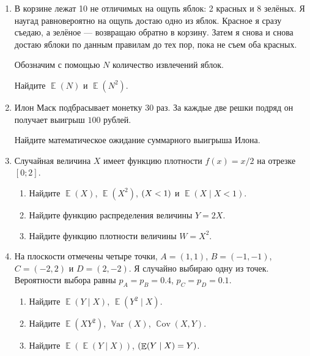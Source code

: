 \documentclass[12pt]{article}
\DeclareMathOperator{\Cov}{\mathbb{C}ov}
\DeclareMathOperator{\Var}{\mathbb{V}ar}
\let\P\relax
\DeclareMathOperator{\P}{\mathbb{P}}
\DeclareMathOperator{\E}{\mathbb{E}}
\begin{document}
\begin{enumerate}
    \item %
    В корзине лежат 10 не отличимых на ощупь яблок: 2 красных и 8 зелёных. 
    Я наугад равновероятно на ощупь достаю одно из яблок.
    Красное я сразу съедаю, а зелёное — возвращаю обратно в корзину. 
    Затем я снова и снова достаю яблоки по данным правилам до тех пор, пока не съем оба красных. 

    Обозначим с помощью $N$ количество извлечений яблок. 

    Найдите $\E(N)$ и $\E(N^2)$.
    
    \item %
    Илон Маск подбрасывает монетку 30 раз. 
    За каждые две решки подряд он получает выигрыш $100$ рублей. 

    Найдите математическое ожидание суммарного выигрыша Илона. 
    
    
    \item %
    Случайная величина $X$ имеет функцию плотности $f(x) = x/2$ на отрезке $[0;2]$. 

    \begin{enumerate}
        \item Найдите $\E(X)$, $\E(X^2)$, $\P(X < 1)$ и $\E(X \mid X < 1)$.
        \item Найдите функцию распределения величины $Y = 2X$.
        \item Найдите функцию плотности величины $W = X^2$.
    \end{enumerate}

    \item На плоскости отмечены четыре точки, $A = (1, 1)$, $B = (-1, -1)$, $C = (-2, 2)$ и $D = (2, -2)$.
Я случайно выбираю одну из точек. 
Вероятности выбора равны $p_A = p_B = 0.4$, $p_C = p_D = 0.1$.

\begin{enumerate}
    \item Найдите $\E(Y \mid X)$, $\E(Y^2 \mid X)$.
    \item Найдите $\E(XY^2)$, $\Var(X)$, $\Cov(X, Y)$.
    \item Найдите $\E(\E(Y \mid X))$, $\P(\E(Y \mid X) = Y)$.
\end{enumerate}



\end{enumerate}
\end{document}
